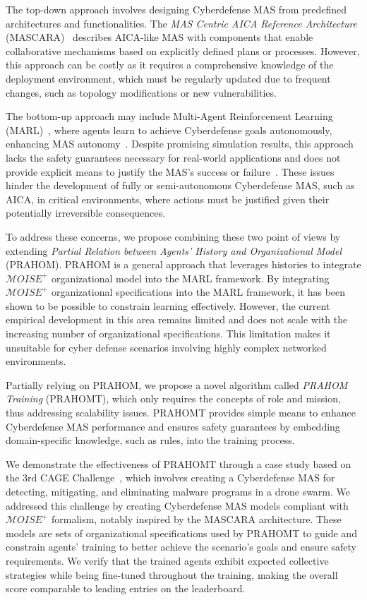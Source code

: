 \documentclass[conference]{IEEEtran}
\begin{document}
The top-down approach involves designing Cyberdefense MAS from predefined architectures and functionalities. The \textit{MAS Centric AICA Reference Architecture} (MASCARA)~\cite{Kott2023} describes AICA-like MAS with components that enable collaborative mechanisms based on explicitly defined plans or processes. However, this approach can be costly as it requires a comprehensive knowledge of the deployment environment, which must be regularly updated due to frequent changes, such as topology modifications or new vulnerabilities.

The bottom-up approach may include Multi-Agent Reinforcement Learning (MARL)~\cite{Albrecht2024}, where agents learn to achieve Cyberdefense goals autonomously, enhancing MAS autonomy~\cite{hammar_stadle4_noms_23}. Despite promising simulation results, this approach lacks the safety guarantees necessary for real-world applications and does not provide explicit means to justify the MAS's success or failure~\cite{dulacarnold2019}. These issues hinder the development of fully or semi-autonomous Cyberdefense MAS, such as AICA, in critical environments, where actions must be justified given their potentially irreversible consequences.

To address these concerns, we propose combining these two point of views by extending \textit{Partial Relation between Agents' History and Organizational Model}~\cite{soule2024} (PRAHOM). PRAHOM is a general approach that leverages histories to integrate $\mathcal{M}OISE^+$ organizational model into the MARL framework. By integrating $\mathcal{M}OISE^+$ organizational specifications into the MARL framework, it has been shown to be possible to constrain learning effectively. However, the current empirical development in this area remains limited and does not scale with the increasing number of organizational specifications. This limitation makes it unsuitable for cyber defense scenarios involving highly complex networked environments.

Partially relying on PRAHOM, we propose a novel algorithm called \textit{PRAHOM Training} (PRAHOMT), which only requires the concepts of role and mission, thus addressing scalability issues. PRAHOMT provides simple means to enhance Cyberdefense MAS performance and ensures safety guarantees by embedding domain-specific knowledge, such as rules, into the training process.

We demonstrate the effectiveness of PRAHOMT through a case study based on the 3rd CAGE Challenge~\cite{cage_challenge_3_announcement}, which involves creating a Cyberdefense MAS for detecting, mitigating, and eliminating malware programs in a drone swarm. We addressed this challenge by creating Cyberdefense MAS models compliant with $\mathcal{M}OISE^+$ formalism, notably inspired by the MASCARA architecture. These models are sets of organizational specifications used by PRAHOMT to guide and constrain agents' training to better achieve the scenario's goals and ensure safety requirements. We verify that the trained agents exhibit expected collective strategies while being fine-tuned throughout the training, making the overall score comparable to leading entries on the leaderboard.
\end{document}
